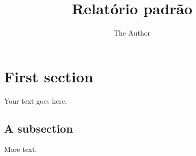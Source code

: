 \documentclass[11pt]{article}
\title{Relatório padrão}
\author{The Author}
\begin{document}
\maketitle

\section{First section}

Your text goes here.

\subsection{A subsection}

More text.
\end{document}
